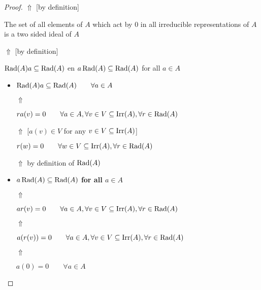 \begin{proof}
\(\Uparrow \) [by definition]

The set of all elements of \(A\) which act by \(0\) in all irreducible representations of \(A\) is a two sided ideal of \(A\)

\(\Uparrow \) [by definition]

\(\operatorname{Rad}(A)a\subseteq \operatorname{Rad}(A)\) en \(a\operatorname{Rad}(A)\subseteq \operatorname{Rad}(A)\) for all \(a\in A\)

\begin{itemize}
  \item \textbf{\(\operatorname{Rad}(A)a\subseteq \operatorname{Rad}(A) \qquad \forall a\in A\)}

\(\Uparrow \)

\(ra(v)=0 \qquad \forall a\in A,\forall v\in V\subseteq \operatorname{Irr}(A), \forall r\in \operatorname{Rad}(A)\)

\(\Uparrow \) [\(a(v)\in V\) for any \(v\in V\subseteq \operatorname{Irr}(A)\)]

\(r(w)=0  \qquad \forall w\in V\subseteq \operatorname{Irr}(A), \forall r\in \operatorname{Rad}(A)\)

\(\Uparrow \) by definition of \(\operatorname{Rad}(A)\)
  \item \textbf{\(a\operatorname{Rad}(A)\subseteq \operatorname{Rad}(A)\) for all \(a\in A\)}

\(\Uparrow \)

\(ar(v)=0 \qquad \forall a\in A,\forall v\in V\subseteq \operatorname{Irr}(A), \forall r\in \operatorname{Rad}(A)\)

\(\Uparrow \)

\(a(r(v))=0 \qquad \forall a\in A,\forall v\in V\subseteq \operatorname{Irr}(A), \forall r\in \operatorname{Rad}(A)\)

\(\Uparrow \)

\(a(0)=0 \qquad \forall a\in A\)
\end{itemize}

\end{proof}

